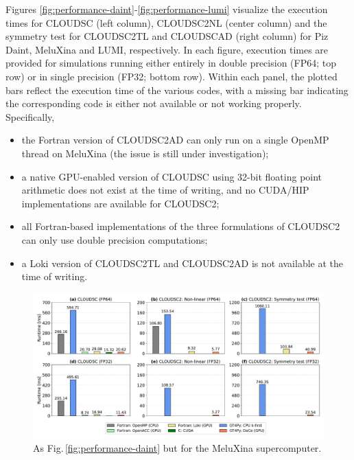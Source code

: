 \documentclass[main.tex]{subfiles}
\begin{document}
    Figures \ref{fig:performance-daint}-\ref{fig:performance-lumi} visualize the execution times for CLOUDSC (left column), CLOUDSC2NL  (center column) and the symmetry test for CLOUDSC2TL and CLOUDSCAD (right column) for Piz Daint, MeluXina and LUMI, respectively. In each figure, execution times are provided for simulations running either entirely in double precision (FP64; top row) or in single precision (FP32; bottom row). Within each panel, the plotted bars reflect the execution time of the various codes, with a missing bar indicating the corresponding code is either not available or not working properly. Specifically,
    \begin{itemize}
        \item the Fortran version of CLOUDSC2AD can only run on a single OpenMP thread on MeluXina (the issue is still under investigation);
        \item a native GPU-enabled version of CLOUDSC using 32-bit floating point arithmetic does not exist at the time of writing, and no CUDA/HIP implementations are available for CLOUDSC2;
        \item all Fortran-based implementations of the three formulations of CLOUDSC2 can only use double precision computations;
        \item a Loki version of CLOUDSC2TL and CLOUDSC2AD is not available at the time of writing.
    \end{itemize}

    \begin{figure}[t!]
        \centering
        \includegraphics[scale=0.44]{img/performance_mlux_2.pdf}
        \caption{As Fig.\,\ref{fig:performance-daint} but for the MeluXina supercomputer.}
        \label{fig:performance-mlux}
    \end{figure}
\end{document}
